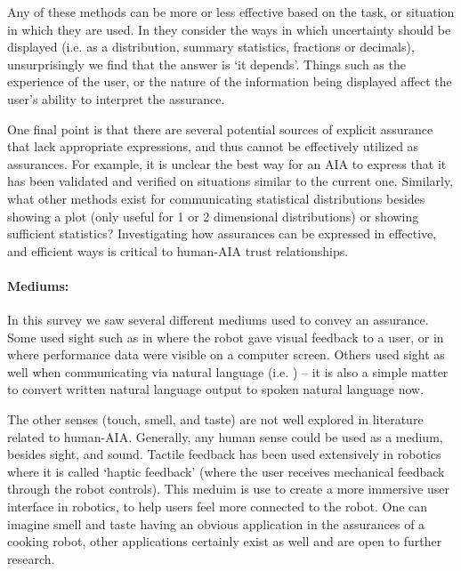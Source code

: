     Any of these methods can be more or less effective based on the task, or situation in which they are used. In \cite{Chen2014-dk,Wallace2001-fm,Kuhn1997-qc,Lacave2002-cu} they consider the ways in which uncertainty should be displayed (i.e. as a distribution, summary statistics, fractions or decimals), unsurprisingly we find that the answer is `it depends'. Things such as the experience of the user, or the nature of the information being displayed affect the user's ability to interpret the assurance.

    One final point is that there are several potential sources of explicit assurance that lack appropriate expressions, and thus cannot be effectively utilized as assurances. For example, it is unclear the best way for an AIA to express that it has been validated and verified on situations similar to the current one. Similarly, what other methods exist for communicating statistical distributions besides showing a plot (only useful for 1 or 2 dimensional distributions) or showing sufficient statistics? Investigating how assurances can be expressed in effective, and efficient ways is critical to human-AIA trust relationships.

    \paragraph{Mediums:} In this survey we saw several different mediums used to convey an assurance. Some used sight such as in \cite{Chadalavada2015-wx} where the robot gave visual feedback to a user, or in \cite{Muir1996-gt} where performance data were visible on a computer screen. Others used sight as well when communicating via natural language (i.e. \cite{Wang2016-id}) -- it is also a simple matter to convert written natural language output to spoken natural language now.
    
    The other senses (touch, smell, and taste) are not well explored in literature related to human-AIA. Generally, any human sense could be used as a medium, besides sight, and sound. Tactile feedback has been used extensively in robotics where it is called `haptic feedback' (where the user receives mechanical feedback through the robot controls). This meduim is use to create a more immersive user interface in robotics, to help users feel more connected to the robot. One can imagine smell and taste having an obvious application in the assurances of a cooking robot, other applications certainly exist as well and are open to further research.

